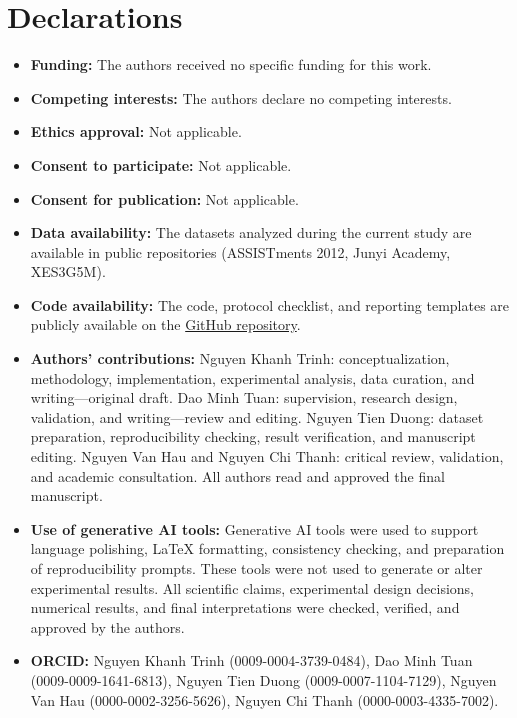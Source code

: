 \documentclass[sn-mathphys]{sn-jnl}
\begin{document}
\backmatter

\section*{Declarations}

\begin{itemize}
    \item \textbf{Funding:} The authors received no specific funding for this work.
    \item \textbf{Competing interests:} The authors declare no competing interests.
    \item \textbf{Ethics approval:} Not applicable.
    \item \textbf{Consent to participate:} Not applicable.
    \item \textbf{Consent for publication:} Not applicable.
    \item \textbf{Data availability:} The datasets analyzed during the current study are available in public repositories (ASSISTments 2012, Junyi Academy, XES3G5M).
    \item \textbf{Code availability:} The code, protocol checklist, and reporting templates are publicly available on the \href{https://github.com/trinhnkt/P0}{GitHub repository}.
    \item \textbf{Authors' contributions:} Nguyen Khanh Trinh: conceptualization, methodology, implementation, experimental analysis, data curation, and writing---original draft. Dao Minh Tuan: supervision, research design, validation, and writing---review and editing. Nguyen Tien Duong: dataset preparation, reproducibility checking, result verification, and manuscript editing. Nguyen Van Hau and Nguyen Chi Thanh: critical review, validation, and academic consultation. All authors read and approved the final manuscript.
    \item \textbf{Use of generative AI tools:} Generative AI tools were used to support language polishing, LaTeX formatting, consistency checking, and preparation of reproducibility prompts. These tools were not used to generate or alter experimental results. All scientific claims, experimental design decisions, numerical results, and final interpretations were checked, verified, and approved by the authors.
    \item \textbf{ORCID:} Nguyen Khanh Trinh (0009-0004-3739-0484), Dao Minh Tuan (0009-0009-1641-6813), Nguyen Tien Duong (0009-0007-1104-7129), Nguyen Van Hau (0000-0002-3256-5626), Nguyen Chi Thanh (0000-0003-4335-7002).
\end{itemize}

\clearpage
\begin{appendices}

\end{appendices}



\end{document}
